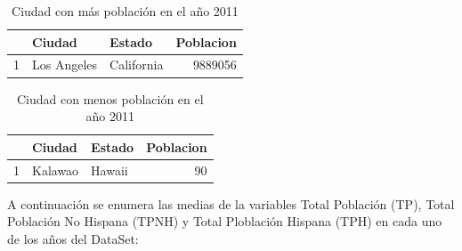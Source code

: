\begin{table}[ht]
\centering
\begin{tabular}{rllr}
  \hline
 & Ciudad & Estado & Poblacion \\ 
  \hline
1 & Los Angeles & California & 9889056 \\ 
   \hline
\end{tabular}
\caption{Ciudad con más población en el año 2011} 
\end{table}


\begin{table}[ht]
\centering
\begin{tabular}{rllr}
  \hline
 & Ciudad & Estado & Poblacion \\ 
  \hline
1 & Kalawao & Hawaii &  90 \\ 
   \hline
\end{tabular}
\caption{Ciudad con menos población en el año 2011} 
\end{table}


A continuación se enumera las medias de la variables Total Población (TP), Total Población  No Hispana (TPNH) y Total Ploblación Hispana (TPH) en cada uno de los años del DataSet:


